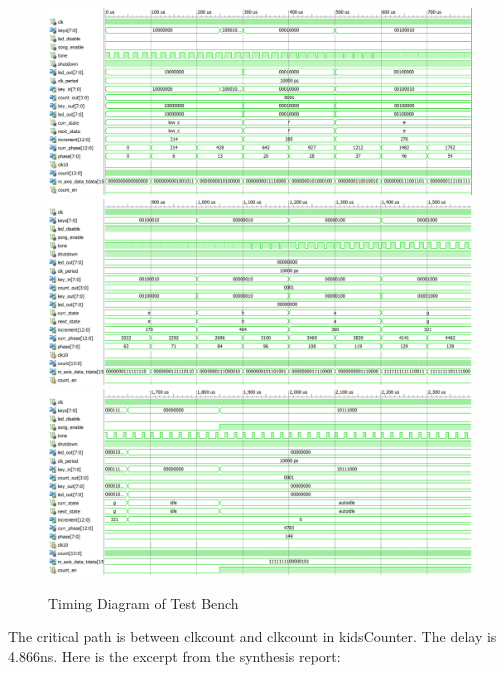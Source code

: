 \documentclass{article}
\begin{document}
    \begin{figure}[H]
      \centering
      \includegraphics[width=6.5in]{sim/1.png}
      \includegraphics[width=6.5in]{sim/2.png}
      \includegraphics[width=6.5in]{sim/3.png}
      \caption{Timing Diagram of Test Bench}
    \end{figure}



    The critical path is between clkcount and clkcount in kidsCounter. The delay is 4.866ns. Here is the excerpt from the synthesis report:
\end{document}
